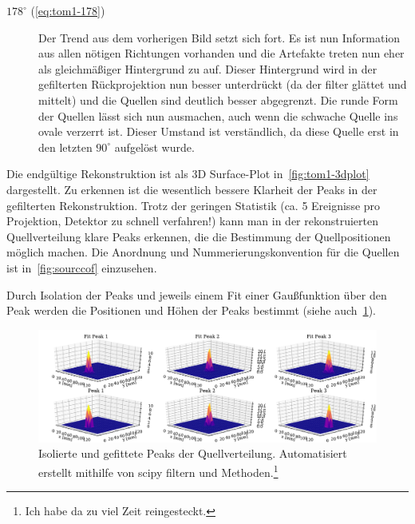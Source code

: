 \documentclass[slug=PET, room=Andreas-Schubert-Bau\,\ 424A, supervisor=Carsten\ Bittrich, coursedate=10.\ 01.\ 2020]{../../Lab_Report_LaTeX/lab_report}
\begin{document}
\begin{description}
\item[\(178^\circ\) (\ref{eq:tom1-178})] Der Trend aus dem vorherigen
  Bild setzt sich fort. Es ist nun Information aus allen n\"otigen
  Richtungen vorhanden und die Artefakte treten nun eher als
  gleichm\"a\ss{}iger Hintergrund zu auf. Dieser Hintergrund wird in
  der gefilterten Rückprojektion nun besser unterdr\"uckt (da der filter gl\"attet
  und mittelt) und die Quellen sind deutlich besser abgegrenzt. Die
  runde Form der Quellen l\"asst sich nun ausmachen, auch wenn die
  schwache Quelle ins ovale verzerrt ist. Dieser Umstand ist
  verst\"andlich, da diese Quelle erst in den letzten \(90^\circ\)
  aufgel\"ost wurde.
\end{description}


Die endg\"ultige Rekonstruktion ist als 3D Surface-Plot
in~\ref{fig:tom1-3dplot} dargestellt. Zu erkennen ist die wesentlich
bessere Klarheit der Peaks in der gefilterten Rekonstruktion. Trotz
der geringen Statistik (ca. 5 Ereignisse pro Projektion, Detektor zu
schnell verfahren!)  kann man in der rekonstruierten Quellverteilung
klare Peaks erkennen, die die Bestimmung der Quellpositionen m\"oglich
machen. Die Anordnung und Nummerierungskonvention f\"ur die Quellen
ist in~\ref{fig:sourccof} einzusehen.

Durch Isolation der Peaks und jeweils einem Fit einer Gaußfunktion
\"uber den Peak werden die Positionen und H\"ohen der Peaks bestimmt
(siehe auch~\ref{fig:tom1-filtered_fit}).

\begin{figure}[h]\centering
  \includegraphics[width=\textwidth]{../auswertung/figs/tom1/filtered_fit.pdf}
  \caption[Fit der Peaks]{Isolierte und gefittete Peaks der
    Quellverteilung. Automatisiert erstellt mithilfe von scipy
    filtern und Methoden.\footnote{Ich habe da zu viel Zeit reingesteckt.}}
  \label{fig:tom1-filtered_fit}
\end{figure}
\end{document}
